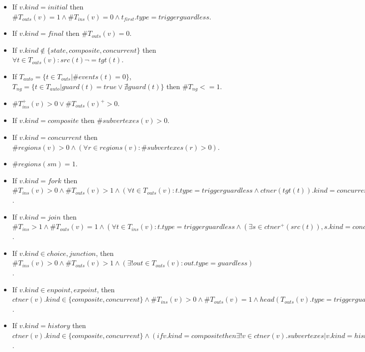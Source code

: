 	\begin{itemize}
		\item If $v.kind = initial$ then $\#T_{outs}(v) = 1 \wedge \#T_{ins}(v) = 0 \wedge t_{first}.type = triggerguardless$. 
		
		\item If $v.kind = final$ then $\#T_{outs}(v) = 0$.
		
		\item If $v.kind \notin \{state, composite, concurrent\}$ then $\forall t \in T_{outs}(v): src(t) \lnot= tgt(t)$. 
		
		\item If $T_{auto} = \{t \in T_{outs} | \#events(t) = 0\}$, $T_{ng} = \{t \in T_{auto} | guard(t) = true \vee \nexists guard(t)\}$ then $\#T_{ng} <= 1$.
		
		\item $\#T_{ins}^+(v) > 0 \vee \#T_{outs}(v)^+ > 0$.
		
		\item If $v.kind = composite$ then $\#subvertexes(v) > 0$. 
		
		\item If $v.kind = concurrent$ then $\#regions(v) > 0 \wedge (\forall r \in regions(v): \#subvertexes(r) > 0)$. 
		
		\item $\#regions(sm) = 1$.
		
		\item If $v.kind = fork$ then $\#T_{ins}(v) > 0 \wedge \#T_{outs}(v) > 1 \wedge (\forall t \in T_{outs}(v): t.type = triggerguardless \wedge ctner(tgt(t)).kind = concurrent)$.
		
		\item If $v.kind = join$ then $\#T_{ins} > 1 \wedge \#T_{outs}(v) = 1 \wedge (\forall t \in T_{ins}(v): t.type = triggerguardless \wedge (\exists s \in ctner^+(src(t)), s.kind=concurrent)) \wedge head(T_{outs}).type = triggerguardless$.
		
		\item If $v.kind \in {choice, junction}$, then $\#T_{ins}(v) > 0 \wedge \#T_{outs}(v) > 1 \wedge (\exists! out \in T_{outs}(v): out.type = guardless)$.
		
		\item If $v.kind \in {enpoint, expoint}$, then $ctner(v).kind \in \{composite, concurrent\} \wedge \#T_{ins}(v) > 0 \wedge \#T_{outs}(v) = 1 \wedge head(T_{outs}(v).type = triggerguardless)$.
		
		\item If $v.kind = history$ then $ctner(v).kind \in \{composite, concurrent\} \wedge (if v.kind = composite then \exists! v \in ctner(v).subvertexes | v.kind = history) \wedge \#T_{ins} > 0$.
	\end{itemize}

